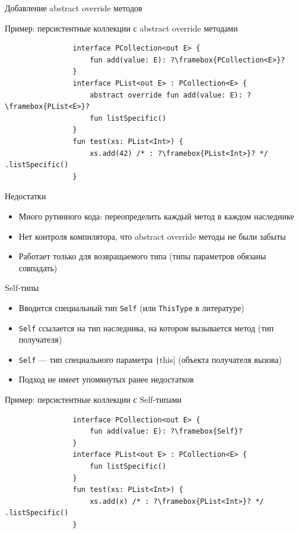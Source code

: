 \documentclass[usenames, dvipsnames]{beamer}
\begin{document}
    \begin{frame}[fragile]{Добавление abstract override методов}
        \begin{block}{Пример: персистентные коллекции с abstract override методами}
            \begin{verbatim}
                interface PCollection<out E> {
                    fun add(value: E): ?\framebox{PCollection<E>}?
                }
                interface PList<out E> : PCollection<E> {
                    abstract override fun add(value: E): ?\framebox{PList<E>}?
                    fun listSpecific()
                }
                fun test(xs: PList<Int>) {
                    xs.add(42) /* : ?\framebox{PList<Int>}? */ .listSpecific()
                }
            \end{verbatim}
        \end{block}

        \begin{block}{Недостатки}
            \begin{itemize}
                \item Много рутинного кода: переопределить каждый метод в каждом наследнике
                \item Нет контроля компилятора, что abstract override методы не были забыты
                \item Работает только для возвращаемого типа (типы параметров обязаны совпадать)
            \end{itemize}
        \end{block}
    \end{frame}

    \begin{frame}[fragile]{Self-типы}
        \begin{itemize}
            \item Вводится специальный тип \texttt{Self} (или \texttt{ThisType} в литературе)
            \item \texttt{Self} ссылается на тип наследника, на котором вызывается метод (тип получателя)
            \item \texttt{Self} --- тип специального параметра \texttt|this| (объекта получателя вызова)
            \item Подход не имеет упомянутых ранее недостатков
        \end{itemize}

        \begin{block}{Пример: персистентные коллекции с Self-типами}
            \begin{verbatim}
                interface PCollection<out E> {
                    fun add(value: E): ?\framebox{Self}?
                }
                interface PList<out E> : PCollection<E> {
                    fun listSpecific()
                }
                fun test(xs: PList<Int>) {
                    xs.add(x) /* : ?\framebox{PList<Int>}? */ .listSpecific()
                }
            \end{verbatim}
        \end{block}
    \end{frame}
\end{document}
